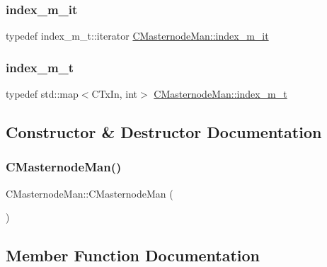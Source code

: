 \subsubsection{\texorpdfstring{index\+\_\+m\+\_\+it}{index\_m\_it}}
{\footnotesize\ttfamily typedef index\+\_\+m\+\_\+t\+::iterator \mbox{\hyperlink{class_c_masternode_man_a3eb6485ee143b7b95b2765f185b8170e}{C\+Masternode\+Man\+::index\+\_\+m\+\_\+it}}}

\mbox{\label{class_c_masternode_man_aa8e5e60e3743c6d3e05a1f5d79e889de}} 
\subsubsection{\texorpdfstring{index\+\_\+m\+\_\+t}{index\_m\_t}}
{\footnotesize\ttfamily typedef std\+::map$<$C\+Tx\+In, int$>$ \mbox{\hyperlink{class_c_masternode_man_aa8e5e60e3743c6d3e05a1f5d79e889de}{C\+Masternode\+Man\+::index\+\_\+m\+\_\+t}}}



\subsection{Constructor \& Destructor Documentation}
\mbox{\label{class_c_masternode_man_a6bc39eb089225397b2d4dd5c1d291868}} 
\subsubsection{\texorpdfstring{C\+Masternode\+Man()}{CMasternodeMan()}}
{\footnotesize\ttfamily C\+Masternode\+Man\+::\+C\+Masternode\+Man (\begin{DoxyParamCaption}{ }\end{DoxyParamCaption})}



\subsection{Member Function Documentation}
\mbox{\label{class_c_masternode_man_a8e648f7e96931e683b3fd6c98a4c4715}} 
